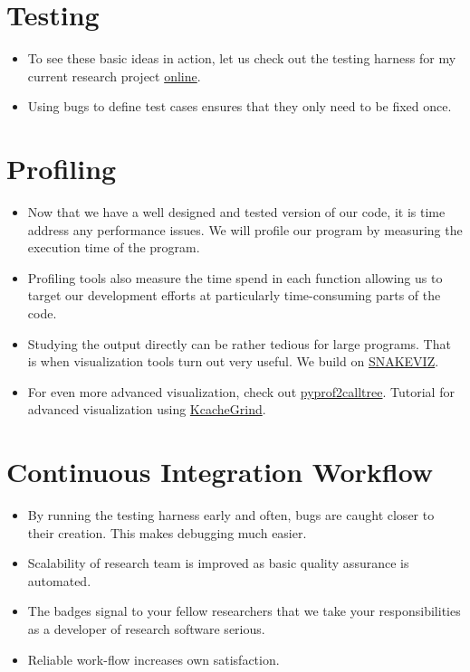 \section{Testing}
\begin{itemize}
\item To see these basic ideas in action, let us check out the testing harness for my current research project \href{https://github.com/robustToolbox/package/tree/master/development/tests}{online}.
\item Using bugs to define test cases ensures that they only need to be fixed once.
\end{itemize}


\section{Profiling}
\begin{itemize}
\item Now that we have a well designed and tested version of our code, it is time address any performance issues. We will profile our program by measuring the execution time of the program. 
\item Profiling tools also measure the time spend in each function allowing us to target our development efforts at particularly time-consuming parts of the code.
\item Studying the output directly can be rather tedious for large programs. That is when visualization tools turn out very useful. We build on \href{http://jiffyclub.github.io/snakeviz}{SNAKEVIZ}.
\item For even more advanced visualization, check out \href{https://github.com/pwaller/pyprof2calltree}{pyprof2calltree}. Tutorial for advanced visualization using \href{http://bit.ly/1SaXJgM}{KcacheGrind}.
\end{itemize}


\section{Continuous Integration Workflow}
\begin{itemize}
\item By running the testing harness early and often, bugs are caught closer to their creation. This makes debugging much easier. 
\item Scalability of research team is improved as basic quality assurance is automated.
\item The badges signal to your fellow researchers that we take your responsibilities as a developer of research software serious.
\item  Reliable work-flow increases own satisfaction.
\end{itemize}

